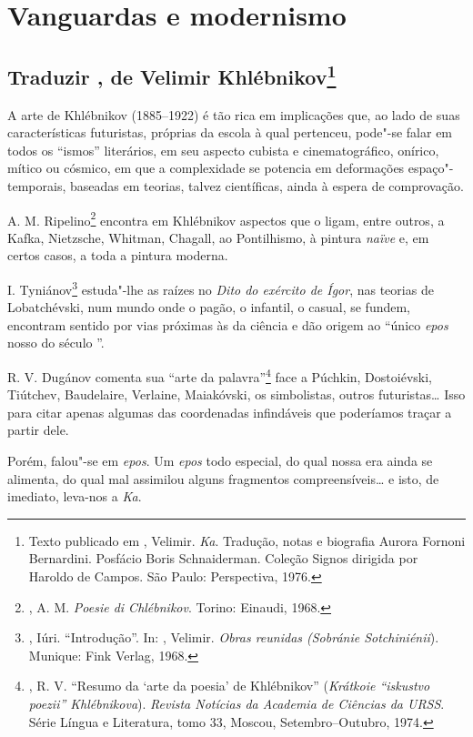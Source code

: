 {{{\part{Vanguardas e modernismo}

\chapter{Traduzir , de Velimir Khlébnikov\footnote{Texto
  publicado em , Velimir. \emph{Ka}. Tradução, notas e
  biografia Aurora Fornoni Bernardini. Posfácio Boris Schnaiderman.
  Coleção Signos dirigida por Haroldo de Campos. São Paulo: Perspectiva,
  1976.}}

A arte de Khlébnikov (1885--1922) é tão rica em implicações que, ao lado
de suas características futuristas, próprias da escola à qual pertenceu,
pode"-se falar em todos os ``ismos'' literários, em seu aspecto cubista e
cinematográfico, onírico, mítico ou cósmico, em que a complexidade se
potencia em deformações espaço"-temporais, baseadas em teorias, talvez
científicas, ainda à espera de comprovação.

A. M. Ripelino\footnote{, A. M. \emph{Poesie di Chlébnikov}.
  Torino: Einaudi, 1968.} encontra em Khlébnikov aspectos que o ligam,
entre outros, a Kafka, Nietzsche, Whitman, Chagall, ao Pontilhismo, à
pintura \emph{naïve} e, em certos casos, a toda a pintura moderna.

I. Tyniánov\footnote{, Iúri. ``Introdução''. In: ,
  Velimir. \emph{Obras reunidas (Sobránie Sotchiniénii}).
  Munique: Fink Verlag, 1968.} estuda"-lhe as raízes no \emph{Dito do
exército de Ígor}, nas teorias de Lobatchévski, num mundo onde o pagão,
o infantil, o casual, se fundem, encontram sentido por vias próximas às
da ciência e dão origem ao ``único \emph{epos} nosso do século ''.

R. V. Dugánov comenta sua ``arte da palavra''\footnote{, R. V.
  ``Resumo da `arte da poesia' de Khlébnikov'' (\emph{Krátkoie ``iskustvo
  poezii'' Khlébnikova}). \emph{Revista Notícias da Academia de Ciências
  da URSS}. Série Língua e Literatura, tomo 33, Moscou,
  Setembro--Outubro, 1974.} face a Púchkin, Dostoiévski, Tiútchev,
Baudelaire, Verlaine, Maiakóvski, os simbolistas, outros futuristas\ldots{}
Isso para citar apenas algumas das coordenadas infindáveis que
poderíamos traçar a partir dele.

Porém, falou"-se em \emph{epos}. Um \emph{epos} todo especial, do qual
nossa era ainda se alimenta, do qual mal assimilou alguns fragmentos
compreensíveis\ldots{} e isto, de imediato, leva-nos a \emph{Ka}.

}}}
